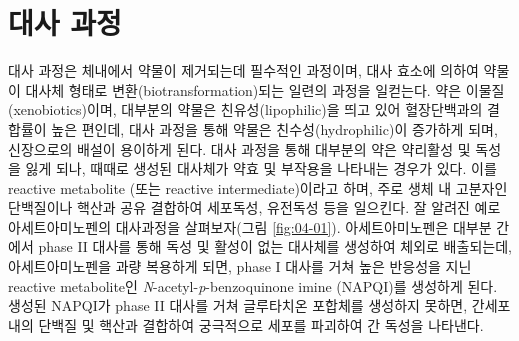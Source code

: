 \documentclass[
  11pt,
  krantz2, a4paper, twoside]{krantz}
\begin{document}
\section{대사 과정}\label{uxb300uxc0ac-uxacfcuxc815}

대사 과정은 체내에서 약물이 제거되는데 필수적인 과정이며, 대사 효소에 의하여 약물이 대사체 형태로 변환(biotransformation)되는 일련의 과정을 일컫는다. 약은 이물질(xenobiotics)이며, 대부분의 약물은 친유성(lipophilic)을 띄고 있어 혈장단백과의 결합률이 높은 편인데, 대사 과정을 통해 약물은 친수성(hydrophilic)이 증가하게 되며, 신장으로의 배설이 용이하게 된다. 대사 과정을 통해 대부분의 약은 약리활성 및 독성을 잃게 되나, 때때로 생성된 대사체가 약효 및 부작용을 나타내는 경우가 있다. 이를 reactive metabolite (또는 reactive intermediate)이라고 하며, 주로 생체 내 고분자인 단백질이나 핵산과 공유 결합하여 세포독성, 유전독성 등을 일으킨다. 잘 알려진 예로 아세트아미노펜의 대사과정을 살펴보자(그림 \ref{fig:04-01}). 아세트아미노펜은 대부분 간에서 phase II 대사를 통해 독성 및 활성이 없는 대사체를 생성하여 체외로 배출되는데, 아세트아미노펜을 과량 복용하게 되면, phase I 대사를 거쳐 높은 반응성을 지닌 reactive metabolite인 \emph{N}-acetyl-\emph{p}-benzoquinone imine (NAPQI)를 생성하게 된다. 생성된 NAPQI가 phase II 대사를 거쳐 글루타치온 포합체를 생성하지 못하면, 간세포 내의 단백질 및 핵산과 결합하여 궁극적으로 세포를 파괴하여 간 독성을 나타낸다.
\end{document}
